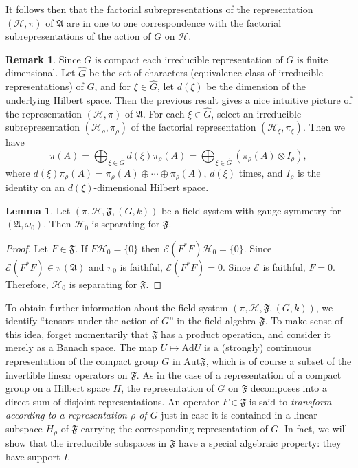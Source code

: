 \documentclass[11pt]{article}
\newcommand{\alg}[1]{\mathfrak{#1}}
\theoremstyle{definition}
\newtheorem{lemma}[thm]{Lemma}
\theoremstyle{definition}
\newtheorem{note}[thm]{Remark}
\theoremstyle{remark}
\def\2#1{{\mathcal #1}}
\def\4#1{{\mathscr #1}}
\def\al#1{{\mathfrak #1}}
\def\om{\omega} \def\Om{\Omega} \def\dd{\partial} \def\D{\Delta}
\newcommand{\Aut}{\mathrm{Aut}}
\newcommand{\fields}{(\pi ,\2H ,\alg{F},(G,k))}
\begin{document}
It follows then that the factorial subrepresentations of the
representation $(\2H ,\pi )$ of $\al A$ are in one to one
correspondence with the factorial subrepresentations of the action of
$G$ on $\2H$.

\begin{note} Since $G$ is compact each irreducible
  representation of $G$ is finite dimensional.  Let
  $\hat{G}$ be the set of characters (equivalence class
  of irreducible representations) of $G$, and for $\xi
  \in \hat{G}$, let $d(\xi )$ be the dimension of the
  underlying Hilbert space.  Then the previous result
  gives a nice intuitive picture of the representation
  $(\2H ,\pi )$ of $\al A$.  For each $\xi \in
  \hat{G}$, select an irreducible subrepresentation
  $(\2H _\rho ,\pi _\rho )$ of the factorial
  representation $(\2H _\xi ,\pi _\xi )$.  Then we have
$$ \pi (A) = \bigoplus _{\xi \in \hat{G}} d(\xi )\pi _{\rho }(A) =
\bigoplus _{\xi \in \hat{G}}(\pi _{\rho}(A)\otimes
I_\rho ) ,$$ where $d(\xi )\pi _\rho (A)=\pi _\rho
(A)\oplus \cdots \oplus \pi _\rho (A)$, $d(\xi )$
times, and $I_\rho$ is the identity on an $d(\xi
)$-dimensional Hilbert space.
\end{note}  


\begin{lemma} Let $\fields$ be a field system with gauge symmetry for
  $(\al A,\om _0 )$.  Then $\2H _0$ is separating for $\al
  F$.  \end{lemma}

\begin{proof} Let $F\in \al F$.  If $F\2H _0=\{ 0\}$
  then $\4E (F^*F)\2H _0=\{ 0\}$.  Since $\4E (F^*F)\in
  \pi (\al A)$ and $\pi _0$ is faithful, $\4E
  (F^*F)=0$.  Since $\4E$ is faithful, $F=0$.
  Therefore, $\2H _0$ is separating for $\al F$.
\end{proof}


To obtain further information about the field system $\fields$, we
identify ``tensors under the action of $G$'' in the field algebra $\al
F$.  To make sense of this idea, forget momentarily that $\al F$ has a
product operation, and consider it merely as a Banach space.  The map
$U\mapsto \mathrm{Ad}U$ is a (strongly) continuous representation of
the compact group $G$ in $\Aut \al F$, which is of course a subset of
the invertible linear operators on $\al F$.  As in the case of a
representation of a compact group on a Hilbert space $H$, the
representation of $G$ on $\al F$ decomposes into a direct sum of
disjoint representations.  An operator $F\in \al F$ is said to
\emph{transform according to a representation $\rho$ of $G$} just in
case it is contained in a linear subspace $H_\rho$ of $\al F$ carrying
the corresponding representation of $G$.  In fact, we will show that
the irreducible subspaces in $\al F$ have a special algebraic
property: they have support $I$.
\end{document}
